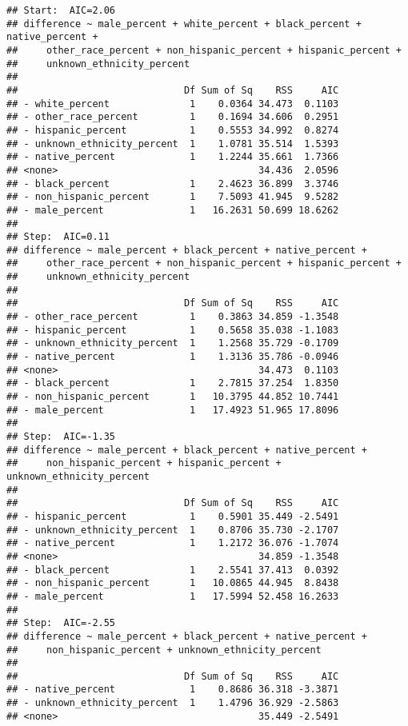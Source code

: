\documentclass[
]{article}
\begin{document}
\begin{verbatim}
## Start:  AIC=2.06
## difference ~ male_percent + white_percent + black_percent + native_percent + 
##     other_race_percent + non_hispanic_percent + hispanic_percent + 
##     unknown_ethnicity_percent
## 
##                             Df Sum of Sq    RSS     AIC
## - white_percent              1    0.0364 34.473  0.1103
## - other_race_percent         1    0.1694 34.606  0.2951
## - hispanic_percent           1    0.5553 34.992  0.8274
## - unknown_ethnicity_percent  1    1.0781 35.514  1.5393
## - native_percent             1    1.2244 35.661  1.7366
## <none>                                   34.436  2.0596
## - black_percent              1    2.4623 36.899  3.3746
## - non_hispanic_percent       1    7.5093 41.945  9.5282
## - male_percent               1   16.2631 50.699 18.6262
## 
## Step:  AIC=0.11
## difference ~ male_percent + black_percent + native_percent + 
##     other_race_percent + non_hispanic_percent + hispanic_percent + 
##     unknown_ethnicity_percent
## 
##                             Df Sum of Sq    RSS     AIC
## - other_race_percent         1    0.3863 34.859 -1.3548
## - hispanic_percent           1    0.5658 35.038 -1.1083
## - unknown_ethnicity_percent  1    1.2568 35.729 -0.1709
## - native_percent             1    1.3136 35.786 -0.0946
## <none>                                   34.473  0.1103
## - black_percent              1    2.7815 37.254  1.8350
## - non_hispanic_percent       1   10.3795 44.852 10.7441
## - male_percent               1   17.4923 51.965 17.8096
## 
## Step:  AIC=-1.35
## difference ~ male_percent + black_percent + native_percent + 
##     non_hispanic_percent + hispanic_percent + unknown_ethnicity_percent
## 
##                             Df Sum of Sq    RSS     AIC
## - hispanic_percent           1    0.5901 35.449 -2.5491
## - unknown_ethnicity_percent  1    0.8706 35.730 -2.1707
## - native_percent             1    1.2172 36.076 -1.7074
## <none>                                   34.859 -1.3548
## - black_percent              1    2.5541 37.413  0.0392
## - non_hispanic_percent       1   10.0865 44.945  8.8438
## - male_percent               1   17.5994 52.458 16.2633
## 
## Step:  AIC=-2.55
## difference ~ male_percent + black_percent + native_percent + 
##     non_hispanic_percent + unknown_ethnicity_percent
## 
##                             Df Sum of Sq    RSS     AIC
## - native_percent             1    0.8686 36.318 -3.3871
## - unknown_ethnicity_percent  1    1.4796 36.929 -2.5863
## <none>                                   35.449 -2.5491

\end{verbatim}
\end{document}
